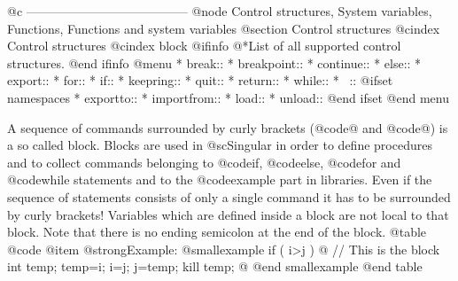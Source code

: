 {{{{{{{@c ---------------------------------------
@node Control structures, System variables, Functions, Functions and system variables
@section Control structures
@cindex Control structures
@cindex block
@ifinfo
@*List of all supported control structures.
@end ifinfo
@menu
* break::
* breakpoint::
* continue::
* else::
* export::
* for::
* if::
* keepring::
* quit::
* return::
* while::
* ~::
@ifset namespaces
* exportto::
* importfrom::
* load::
* unload::
@end ifset
@end menu

A sequence of commands surrounded by curly brackets (@code{@{} and
@code{@}}) is a so called block. Blocks are used in @sc{Singular} in
order to define procedures and to collect commands belonging to
@code{if}, @code{else}, @code{for} and @code{while} statements and to the
@code{example} part in libraries. Even if
the sequence of statements consists of only a single command it has to be
surrounded by curly brackets!
Variables which are defined inside a block
are not local to that block. Note that there is no ending semicolon at
the end of the block.
@table @code
@item @strong{Example:}
@smallexample
if ( i>j )
@{
  // This is the block
  int temp;
  temp=i;
  i=j;
  j=temp;
  kill temp;
@}
@end smallexample
@end table

}}}}}}}
